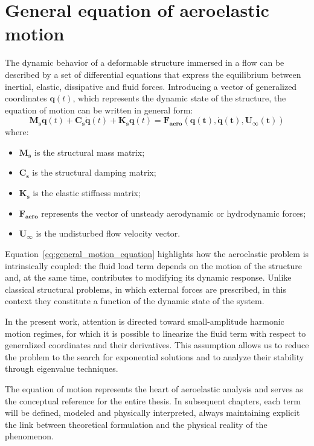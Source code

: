 \section{General equation of aeroelastic motion}
The dynamic behavior of a deformable structure immersed in a flow can be described by a set of differential equations
that express the equilibrium between inertial, elastic, dissipative and fluid forces. Introducing a vector of generalized coordinates $\mathbf{q}(t)$,
which represents the dynamic state of the structure, the equation of motion can be written in general form:
\begin{equation}
    \mathbf{M_s} \ddot{\mathbf{q}}(t) + \mathbf{C_s} \dot{\mathbf{q}}(t) + \mathbf{K_s} \mathbf{q}(t) = \mathbf{F_{aero}(\mathbf{q(t),\dot{q}(t),U_{{\infty}}(t)})}
    \label{eq:general_motion_equation}
\end{equation}
where:
\begin{itemize}
    \item $\mathbf{M_s}$ is the structural mass matrix;
    \item $\mathbf{C_s}$ is the structural damping matrix;
    \item $\mathbf{K_s}$ is the elastic stiffness matrix;
    \item $\mathbf{F_{aero}}$ represents the vector of unsteady aerodynamic or hydrodynamic forces;
    \item $\mathbf{U_{{\infty}}}$ is the undisturbed flow velocity vector.
\end{itemize}

Equation~\ref{eq:general_motion_equation} highlights how the aeroelastic problem is intrinsically coupled: the fluid load term depends on
the motion of the structure and, at the same time, contributes to modifying its dynamic response. Unlike classical structural problems, in which external forces
are prescribed, in this context they constitute a function of the dynamic state of the system.

In the present work, attention is directed toward small-amplitude harmonic motion regimes, for which it is possible to linearize the fluid term with respect
to generalized coordinates and their derivatives. This assumption allows us to reduce the problem to the search for exponential solutions and
to analyze their stability through eigenvalue techniques.

The equation of motion represents the heart of aeroelastic analysis and serves as the conceptual reference for the entire thesis. In subsequent chapters,
each term will be defined, modeled and physically interpreted, always maintaining explicit the link between theoretical formulation and the physical reality of the phenomenon.

